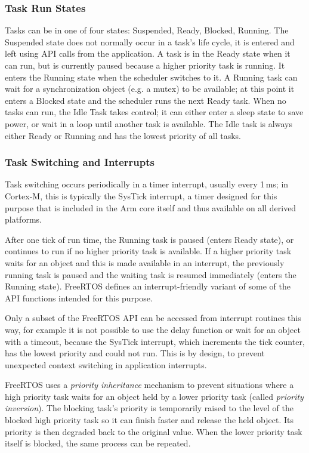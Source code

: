 \subsubsection{Task Run States}

Tasks can be in one of four states: Suspended, Ready, Blocked, Running. The Suspended state does not normally occur in a task's life cycle, it is entered and left using API calls from the application. A task is in the Ready state when it can run, but is currently paused because a higher priority task is running. It enters the Running state when the scheduler switches to it. A Running task can wait for a synchronization object (e.g. a mutex) to be available; at this point it enters a Blocked state and the scheduler runs the next Ready task. When no tasks can run, the Idle Task takes control; it can either enter a sleep state to save power, or wait in a loop until another task is available. The Idle task is always either Ready or Running and has the lowest priority of all tasks.

\subsubsection{Task Switching and Interrupts}

Task switching occurs periodically in a timer interrupt, usually every 1\,ms; in Cortex-M, this is typically the SysTick interrupt, a timer designed for this purpose that is included in the Arm core itself and thus available on all derived platforms.

After one tick of run time, the Running task is paused (enters Ready state), or continues to run if no higher priority task is available. If a higher priority task waits for an object and this is made available in an interrupt, the previously running task is paused and the waiting task is resumed immediately (enters the Running state). FreeRTOS defines an interrupt-friendly variant of some of the \gls{API} functions intended for this purpose. 

Only a subset of the FreeRTOS \gls{API} can be accessed from interrupt routines this way, for example it is not possible to use the delay function or wait for an object with a timeout, because the SysTick interrupt, which increments the tick counter, has the lowest priority and could not run. This is by design, to prevent unexpected context switching in application interrupts.

FreeRTOS uses a \textit{priority inheritance} mechanism to prevent situations where a high priority task waits for an object held by a lower priority task (called \textit{priority inversion}). The blocking task's priority is temporarily raised to the level of the blocked high priority task so it can finish faster and release the held object. Its priority is then degraded back to the original value. When the lower priority task itself is blocked, the same process can be repeated.

